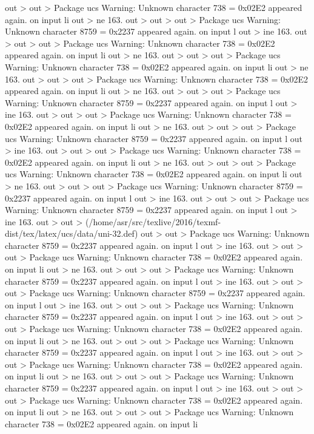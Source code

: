 out >
out > Package ucs Warning: Unknown character 738 = 0x02E2 appeared again. on input li
out > ne 163.
out >
out >
out > Package ucs Warning: Unknown character 8759 = 0x2237 appeared again. on input l
out > ine 163.
out >
out >
out > Package ucs Warning: Unknown character 738 = 0x02E2 appeared again. on input li
out > ne 163.
out >
out >
out > Package ucs Warning: Unknown character 738 = 0x02E2 appeared again. on input li
out > ne 163.
out >
out >
out > Package ucs Warning: Unknown character 738 = 0x02E2 appeared again. on input li
out > ne 163.
out >
out >
out > Package ucs Warning: Unknown character 8759 = 0x2237 appeared again. on input l
out > ine 163.
out >
out >
out > Package ucs Warning: Unknown character 738 = 0x02E2 appeared again. on input li
out > ne 163.
out >
out >
out > Package ucs Warning: Unknown character 8759 = 0x2237 appeared again. on input l
out > ine 163.
out >
out >
out > Package ucs Warning: Unknown character 738 = 0x02E2 appeared again. on input li
out > ne 163.
out >
out >
out > Package ucs Warning: Unknown character 738 = 0x02E2 appeared again. on input li
out > ne 163.
out >
out >
out > Package ucs Warning: Unknown character 8759 = 0x2237 appeared again. on input l
out > ine 163.
out >
out >
out > Package ucs Warning: Unknown character 8759 = 0x2237 appeared again. on input l
out > ine 163.
out >
out > (/home/asr/src/texlive/2016/texmf-dist/tex/latex/ucs/data/uni-32.def)
out >
out > Package ucs Warning: Unknown character 8759 = 0x2237 appeared again. on input l
out > ine 163.
out >
out >
out > Package ucs Warning: Unknown character 738 = 0x02E2 appeared again. on input li
out > ne 163.
out >
out >
out > Package ucs Warning: Unknown character 8759 = 0x2237 appeared again. on input l
out > ine 163.
out >
out >
out > Package ucs Warning: Unknown character 8759 = 0x2237 appeared again. on input l
out > ine 163.
out >
out >
out > Package ucs Warning: Unknown character 8759 = 0x2237 appeared again. on input l
out > ine 163.
out >
out >
out > Package ucs Warning: Unknown character 738 = 0x02E2 appeared again. on input li
out > ne 163.
out >
out >
out > Package ucs Warning: Unknown character 8759 = 0x2237 appeared again. on input l
out > ine 163.
out >
out >
out > Package ucs Warning: Unknown character 738 = 0x02E2 appeared again. on input li
out > ne 163.
out >
out >
out > Package ucs Warning: Unknown character 8759 = 0x2237 appeared again. on input l
out > ine 163.
out >
out >
out > Package ucs Warning: Unknown character 738 = 0x02E2 appeared again. on input li
out > ne 163.
out >
out >
out > Package ucs Warning: Unknown character 738 = 0x02E2 appeared again. on input li
